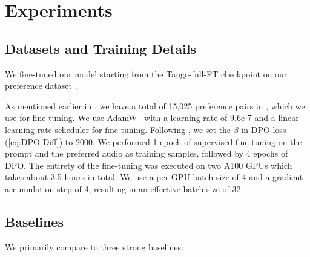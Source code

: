 \section{Experiments}

\subsection{Datasets and Training Details}

We fine-tuned our model starting from the \textsf{Tango-full-FT} checkpoint on our preference dataset \dataset{}.

As mentioned earlier in , we have a total of 15,025 preference pairs in \dataset{}, which we use for fine-tuning. We use AdamW~\cite{loshchilov2017decoupled} with a learning rate of 9.6e-7 and a linear learning-rate scheduler for fine-tuning. Following \citet{wallace2023diffusion}, we set the $\beta$ in DPO loss (\cref{eq:DPO-Diff}) to 2000. We performed 1 epoch of supervised fine-tuning on the prompt and the preferred audio as training samples, followed by 4 epochs of DPO. The entirety of the fine-tuning was executed on two A100 GPUs which takes about 3.5 hours in total. We use a per GPU batch size of 4 and a gradient accumulation step of 4, resulting in an effective batch size of 32.

\subsection{Baselines}
We primarily compare \model{} to three strong baselines:

